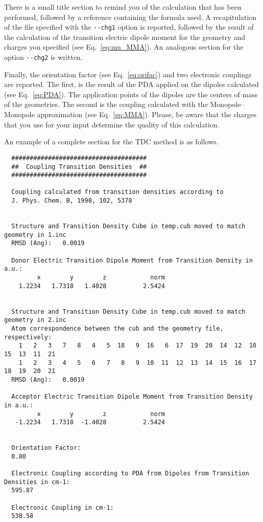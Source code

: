 \documentclass[a4paper]{article}
\begin{document}
There is a small title section to remind you of the calculation that has been performed, followed by a reference containing the formula used. A recapitulation of the file specified with the \verb|--chg1| option is reported, followed by the result of the calculation of the transition electric dipole moment for the geometry and charges you specified (see Eq.~\ref{eq:mu_MMA}). An analogous section for the option \verb|--chg2| is written.

Finally, the orientation factor (see Eq.~\ref{eq:orifac}) and two electronic couplings are reported. The first, is the result of the PDA applied on the dipoles calculated (see Eq.~\ref{eq:PDA}). The application points of the dipoles are the centers of mass of the geometries. The second is the coupling calculated with the Monopole--Monopole approximation (see Eq.~\ref{eq:MMA}).
Please, be aware that the charges that you use for your input determine the quality of this calculation.

An example of a complete section for the TDC method is as follows.

\begin{verbatim}
  #####################################
  ##  Coupling Transition Densities  ##
  #####################################
  
  Coupling calculated from transition densities according to
  J. Phys. Chem. B, 1998, 102, 5378
  
  
  Structure and Transition Density Cube in temp.cub moved to match geometry in 1.inc
  RMSD (Ang):   0.0019
  
  Donor Electric Transition Dipole Moment from Transition Density in a.u.:
         x        y        z            norm
    1.2234   1.7318   1.4028          2.5424
  
  
  Structure and Transition Density Cube in temp.cub moved to match geometry in 2.inc
  Atom correspondence between the cub and the geometry file, respectively:
    1   2   3   7   8   4   5  18   9  16   6  17  19  20  14  12  10  15  13  11  21 
    1   2   3   4   5   6   7   8   9  10  11  12  13  14  15  16  17  18  19  20  21 
  RMSD (Ang):   0.0019
  
  Acceptor Electric Transition Dipole Moment from Transition Density in a.u.:
         x        y        z            norm
   -1.2234   1.7318  -1.4028          2.5424
  
  
  Orientation Factor:
  0.80
    
  Electronic Coupling according to PDA from Dipoles from Transition Densities in cm-1:
  595.87    
  
  Electronic Coupling in cm-1:
  538.58    
  
\end{verbatim}
\end{document}
